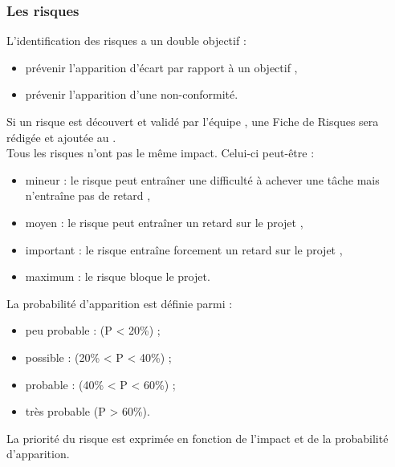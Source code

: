 \subsubsection*{Les risques}

L'identification des risques a un double objectif : 
\begin{itemize}
\item prévenir l'apparition d'écart par rapport à un objectif ,
\item prévenir l'apparition d'une non-conformité. \\
\end{itemize}
Si un risque est découvert et validé par l'équipe \PICCourt, une Fiche de Risques sera rédigée et ajoutée au \PR.\\

Tous les risques n'ont pas le même impact. Celui-ci peut-être :
\begin{itemize}
\item mineur : le risque peut entraîner une difficulté à achever une tâche mais n'entraîne pas de retard ,
\item moyen : le risque peut entraîner un retard sur le projet ,
\item important : le risque entraîne forcement un retard sur le projet ,
\item maximum : le risque bloque le projet.\\
\end{itemize}

La probabilité d'apparition est définie parmi :
\begin{itemize}
 \item peu probable : (P < 20\%) ;
 \item possible : (20\% < P < 40\%) ;
 \item probable : (40\% < P < 60\%) ;
 \item très probable (P > 60\%).\\
\end{itemize}

La priorité du risque est exprimée en fonction de l'impact et de la probabilité d'apparition. \\

